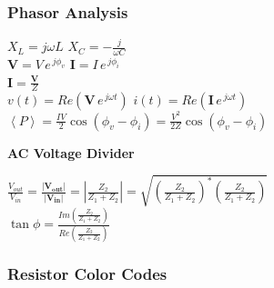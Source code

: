 \documentclass[11pt, twocolumn]{article}
\begin{document}
\subsubsection*{Phasor Analysis}
\begin{center}
$X_L = j \omega L$ \hspace{3 cm} $X_C = -\frac{j}{\omega C}$\\
$\mathbf{V} = V \, e^{\,j \phi_v}$ \hspace{3 cm}
$\mathbf{I} = I \, e^{\,j \phi_i}$\\
$\mathbf{I} = \frac{\mathbf{V}}{Z}$\\
$v(t) = Re(\mathbf{V} \, e^{\,j\omega t})$ \hspace{1.5 cm}
$i(t) = Re(\mathbf{I} \, e^{\,j\omega t})$\\
$\left< P \right> = \frac{IV}{2} \cos(\phi_v - \phi_i)
                 = \frac{V^2}{2Z} \cos(\phi_v - \phi_i)$
\end{center}
\textbf{AC Voltage Divider}
\begin{center}
$\frac{V_{out}}{V_{in}} = \frac{|\mathbf{V_{out}}|}{|\mathbf{V_{in}}|}
  = \left| \frac{Z_2}{Z_1 + Z_2} \right|
  = \sqrt{ \left( \frac{Z_2}{Z_1 + Z_2} \right)^*
           \left( \frac{Z_2}{Z_1 + Z_2} \right) }$\\
$\tan \phi = \frac{ Im \left( \frac{Z_2}{Z_1 + Z_2} \right) }
                { Re \left( \frac{Z_2}{Z_1 + Z_2} \right) }$
\end{center}

\subsubsection*{Resistor Color Codes}
\end{document}
